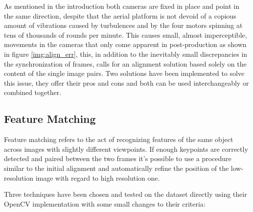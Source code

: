 As mentioned in the introduction both cameras are fixed in place and point in the same direction, despite that the aerial platform is not devoid of a copious amount of vibrations caused by turbulences and by the four motors spinning at tens of thousands of rounds per minute.
This causes small, almost imperceptible, movements in the cameras that only come apparent in post-production as shown in figure \ref{img:align_err}, this, in addition to the inevitably small discrepancies in the synchronization of frames, calls for an alignment solution based solely on the content of the single image pairs. Two solutions have been implemented to solve this issue, they offer their pros and cons and both can be used interchangeably or combined together.


\subsection {Feature Matching}
\label{subsec:feature_match}

Feature matching refers to the act of recognizing features of the same object across images with slightly different viewpoints\cite{feat_match}. If enough keypoints are correctly detected and paired between the two frames it's possible to use a procedure similar to the initial alignment and automatically refine the position of the low-resolution image with regard to high resolution one.

Three techniques have been chosen and tested on the dataset directly using their OpenCV implementation with some small changes to their criteria\cite{6126544}\cite{lowe1999object}\cite{6809191}\cite{DBLP:journals/corr/abs-1710-02726}:

